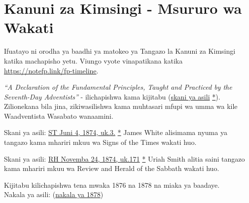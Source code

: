 \section*{Kanuni za Kimsingi - Msururo wa Wakati} \label{appendix:timeline}


Ifuatayo ni orodha ya baadhi ya matokeo ya Tangazo la Kanuni za Kimsingi katika machapisho yetu. Viungo vyote vinapatikana katika \href{https://notefp.link/fp-timeline}{https://notefp.link/fp-timeline}.





\textit{“A Declaration of the Fundamental Principles, Taught and Practiced by the Seventh-Day Adventists”} - ilichapishwa kama kijitabu (\href{https://adventistdigitallibrary.org/islandora/object/adl:366607?link_only=true}{skani ya asili} \href{https://forgotten-pillar.s3.us-east-2.amazonaws.com/A+declaration+of+the+fundamental+principles+taught+and+practiced+by+the+Seventh-day+Adventists++.pdf}{*}). Zilionekana bila jina, zikiwasilishwa kama muhtasari mfupi wa umma wa kile Waadventista Wasabato wanaamini.






Skani ya asili: \href{https://adventistdigitallibrary.org/adl-364148/signs-times-june-4-1874}{ST Juni 4, 1874, uk.3.} \href{https://forgotten-pillar.s3.us-east-2.amazonaws.com/Signs+of+the+Times+_+June+4%2C+1874++.pdf}{*} James White alisimama nyuma ya tangazo kama mhariri mkuu wa Signs of the Times wakati huo.




Skani ya asili: \href{https://documents.adventistarchives.org/Periodicals/RH/RH18741124-V44-22.pdf}{RH Novemba 24, 1874, uk.171} \href{https://forgotten-pillar.s3.us-east-2.amazonaws.com/RH18741124-V44-22.pdf}{*} Uriah Smith alitia saini tangazo kama mhariri mkuu wa Review and Herald of the Sabbath wakati huo.






Kijitabu kilichapishwa tena mwaka 1876 na 1878 na miaka ya baadaye. \\
Nakala ya asili: (\href{https://adventistdigitallibrary.org/islandora/object/adl%3A22250872?solr_nav%5Bid%5D=a09d3902c2540c98eb7f&solr_nav%5Bpage%5D=56&solr_nav%5Boffset%5D=3}{nakala ya 1878})



